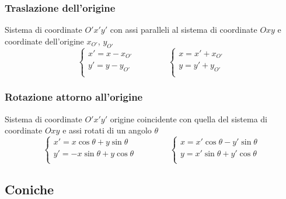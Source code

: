 \subsubsection{Traslazione dell'origine}
Sistema di coordinate $O'x'y'$ con assi paralleli al sistema di coordinate $Oxy$ e coordinate dell'origine $x_{O'}$, $y_{O'}$
\begin{equation}
    \begin{cases}
        x' = x - x_{O'} \\
        y' = y - y_{O'} \\
    \end{cases}
    \qquad \qquad
    \begin{cases}
        x  = x'+ x_{O'} \\
        y  = y'+ y_{O'} \\
    \end{cases}
\end{equation}
\subsubsection{Rotazione attorno all'origine}
Sistema di coordinate $O'x'y'$ origine coincidente con quella del sistema di coordinate $Oxy$ e assi rotati di un angolo $\theta$
\begin{equation}
    \begin{cases}
        x' =  x \cos \theta + y \sin \theta \\
        y' = -x \sin \theta + y \cos \theta \\
    \end{cases}
    \qquad \qquad
    \begin{cases}
        x  =  x'\cos \theta - y'\sin \theta \\
        y  =  x'\sin \theta + y'\cos \theta \\
    \end{cases}
\end{equation}

\subsection{Coniche}
